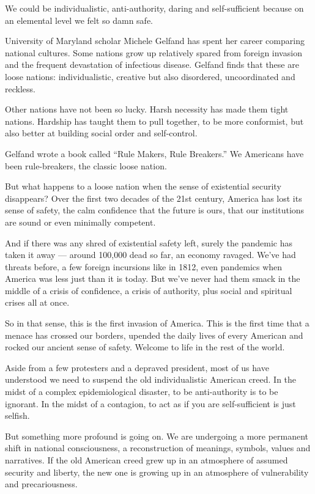 We could be individualistic, anti-authority, daring and self-sufficient
because on an elemental level we felt so damn safe.

University of Maryland scholar Michele Gelfand has spent her career
comparing national cultures. Some nations grow up relatively spared from
foreign invasion and the frequent devastation of infectious disease.
Gelfand finds that these are loose nations: individualistic, creative
but also disordered, uncoordinated and reckless.

Other nations have not been so lucky. Harsh necessity has made them
tight nations. Hardship has taught them to pull together, to be more
conformist, but also better at building social order and self-control.

Gelfand wrote a book called ``Rule Makers, Rule Breakers.'' We Americans
have been rule-breakers, the classic loose nation.

But what happens to a loose nation when the sense of existential
security disappears? Over the first two decades of the 21st century,
America has lost its sense of safety, the calm confidence that the
future is ours, that our institutions are sound or even minimally
competent.

And if there was any shred of existential safety left, surely the
pandemic has taken it away --- around 100,000 dead so far, an economy
ravaged. We've had threats before, a few foreign incursions like in
1812, even pandemics when America was less just than it is today. But
we've never had them smack in the middle of a crisis of confidence, a
crisis of authority, plus social and spiritual crises all at once.

So in that sense, this is the first invasion of America. This is the
first time that a menace has crossed our borders, upended the daily
lives of every American and rocked our ancient sense of safety. Welcome
to life in the rest of the world.

Aside from a few protesters and a depraved president, most of us have
understood we need to suspend the old individualistic American creed. In
the midst of a complex epidemiological disaster, to be anti-authority is
to be ignorant. In the midst of a contagion, to act as if you are
self-sufficient is just selfish.

But something more profound is going on. We are undergoing a more
permanent shift in national consciousness, a reconstruction of meanings,
symbols, values and narratives. If the old American creed grew up in an
atmosphere of assumed security and liberty, the new one is growing up in
an atmosphere of vulnerability and precariousness.


